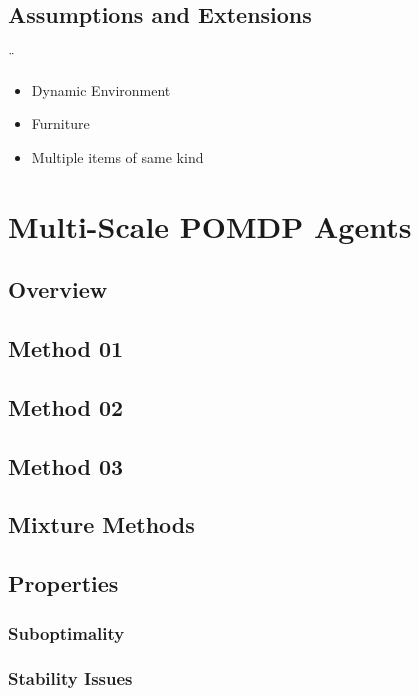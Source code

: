 \subsection{Assumptions and Extensions}¨
\begin{itemize}
    \item Dynamic Environment
    \item Furniture
    \item Multiple items of same kind
\end{itemize}
\section{Multi-Scale POMDP Agents}\label{sec:MultiScale}
\subsection{Overview}
\subsection{Method 01}
\subsection{Method 02}
\subsection{Method 03}
\subsection{Mixture Methods}
\subsection{Properties}
\subsubsection{Suboptimality}
\subsubsection{Stability Issues}

